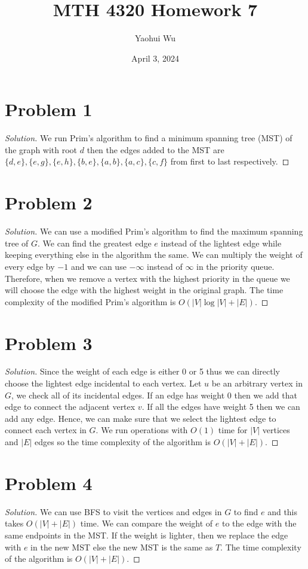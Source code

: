 \documentclass[12pt]{article}
\title{MTH 4320 Homework 7}
\author{Yaohui Wu}
\date{April 3, 2024}
\newenvironment*{solution}{\begin{proof}[Solution]}{\end{proof}}
\begin{document}
\maketitle
\section*{Problem 1}
\begin{solution}
    We run Prim's algorithm to find a minimum spanning tree (MST) of the graph
    with root \(d\) then the edges added to the MST are \(\{d,e\},\{e,g\},\{e,
    h\},\{b,e\},\{a,b\},\{a,c\},\{c,f\}\) from first to last respectively.
\end{solution}
\section*{Problem 2}
\begin{solution}
    We can use a modified Prim's algorithm to find the maximum spanning tree
    of \(G\). We can find the greatest edge \(e\) instead of the lightest edge
    while keeping everything else in the algorithm the same. We can multiply
    the weight of every edge by \(-1\) and we can use \(-\infty\) instead of
    \(\infty\) in the priority queue. Therefore, when we remove a vertex with
    the highest priority in the queue we will choose the edge with the highest
    weight in the original graph. The time complexity of the modified Prim's
    algorithm is \(O(|V|\log|V|+|E|)\).
\end{solution}
\section*{Problem 3}
\begin{solution}
    Since the weight of each edge is either 0 or 5 thus we can directly choose
    the lightest edge incidental to each vertex. Let \(u\) be an arbitrary
    vertex in \(G\), we check all of its incidental edges. If an edge has
    weight 0 then we add that edge to connect the adjacent vertex \(v\). If
    all the edges have weight 5 then we can add any edge. Hence, we can make
    sure that we select the lightest edge to connect each vertex in \(G\). We
    run operations with \(O(1)\) time for \(|V|\) vertices and \(|E|\) edges
    so the time complexity of the algorithm is \(O(|V|+|E|)\).
\end{solution}
\section*{Problem 4}
\begin{solution}
    We can use BFS to visit the vertices and edges in \(G\) to find \(e\) and
    this takes \(O(|V|+|E|)\) time. We can compare the weight of \(e\) to the
    edge with the same endpoints in the MST. If the weight is lighter, then we
    replace the edge with \(e\) in the new MST else the new MST is the same as
    \(T\). The time complexity of the algorithm is \(O(|V|+|E|)\).
\end{solution}
\end{document}
